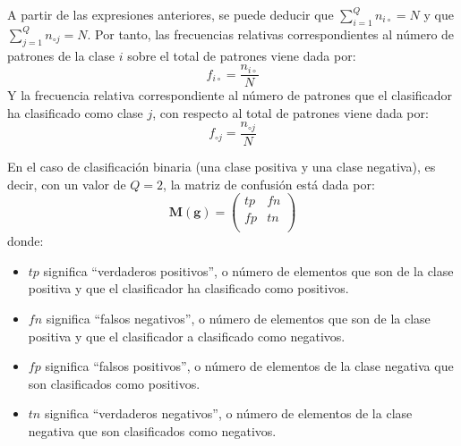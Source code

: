 A partir de las expresiones anteriores, se puede deducir que $\displaystyle
\sum_{i=1}^Q n_{i\circ}=N$ y que $\displaystyle \sum_{j=1}^Q n_{\circ j}=N$. Por tanto,
las frecuencias relativas correspondientes al número de patrones de la clase $i$ sobre el
total de patrones viene dada por:
\begin{displaymath}
f_{i \circ}= \frac{n_{i \circ}}{N}
\end{displaymath}
Y la frecuencia relativa correspondiente al número de patrones que el clasificador ha
clasificado como clase $j$, con respecto al total de patrones viene dada por:
\begin{displaymath}
f_{\circ j}= \frac{n_{\circ j}}{N}
\end{displaymath}

En el caso de clasificación binaria (una clase positiva y una clase negativa), es decir,
con un valor de $Q=2$, la matriz de confusión está dada por:
\begin{displaymath}
\mathbf{M(g)} =
\left( \begin{array}{cc}
tp & fn\\
fp & tn\\
\end{array} \right)
\end{displaymath}
donde:
\begin{itemize}
\item $tp$ significa ``verdaderos positivos'', o número de elementos que son de
la clase positiva y que el clasificador ha clasificado como positivos.
\item $fn$ significa ``falsos negativos'', o número de elementos que son de la clase
positiva y que el clasificador a clasificado como negativos.
\item $fp$ significa ``falsos positivos'', o número de elementos de la clase negativa
que son clasificados como positivos.
\item $tn$ significa ``verdaderos negativos'', o número de elementos de la clase
negativa que son clasificados como negativos.
\end{itemize}

%

